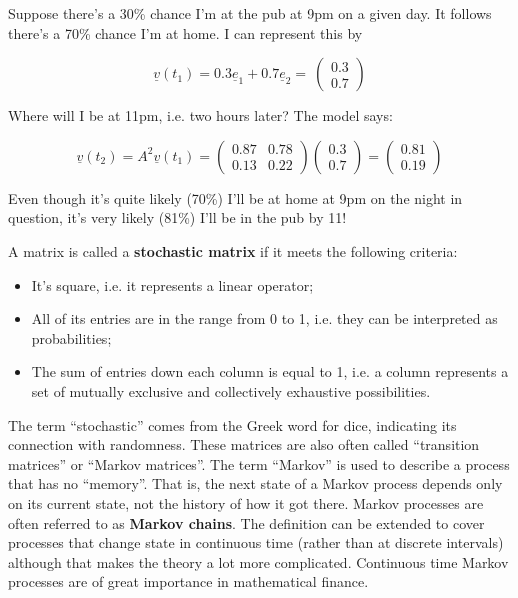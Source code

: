 \documentclass[oneside,english]{amsbook}
\numberwithin{section}{chapter}
\theoremstyle{plain}
\theoremstyle{definition}
\begin{document}
Suppose there's a 30\% chance I'm at the pub at 9pm on a given day. It
follows there's a 70\% chance I'm at home. I can represent this by

\[\underline{v}\left( t_{1} \right) = 0.3{\underline{e}}_{1} + 0.7{\underline{e}}_{2} = \ \begin{pmatrix}
	0.3 \\
	0.7
\end{pmatrix}\]

Where will I be at 11pm, i.e. two hours later? The model says:

\[{\underline{v}\left( t_{2} \right) = A^{2}\underline{v}\left( t_{1} \right)
}{= \begin{pmatrix}
		0.87 & 0.78 \\
		0.13 & 0.22
	\end{pmatrix}\begin{pmatrix}
		0.3 \\
		0.7
	\end{pmatrix}
}{= \begin{pmatrix}
		0.81 \\
		0.19
\end{pmatrix}}\]

Even though it's quite likely (70\%) I'll be at home at 9pm on the night
in question, it's very likely (81\%) I'll be in the pub by 11!

A matrix is called a \textbf{stochastic matrix} if it meets the
following criteria:

\begin{itemize}
	\item
	It's square, i.e. it represents a linear operator;
	\item
	All of its entries are in the range from 0 to 1, i.e. they can be
	interpreted as probabilities;
	\item
	The sum of entries down each column is equal to 1, i.e. a column
	represents a set of mutually exclusive and collectively exhaustive
	possibilities.
\end{itemize}

The term ``stochastic'' comes from the Greek word for dice, indicating
its connection with randomness. These matrices are also often called
``transition matrices'' or ``Markov matrices''. The term ``Markov'' is
used to describe a process that has no ``memory''. That is, the next
state of a Markov process depends only on its current state, not the
history of how it got there. Markov processes are often referred to as
\textbf{Markov chains}. The definition can be extended to cover
processes that change state in continuous time (rather than at discrete
intervals) although that makes the theory a lot more complicated.
Continuous time Markov processes are of great importance in mathematical
finance.
\end{document}
